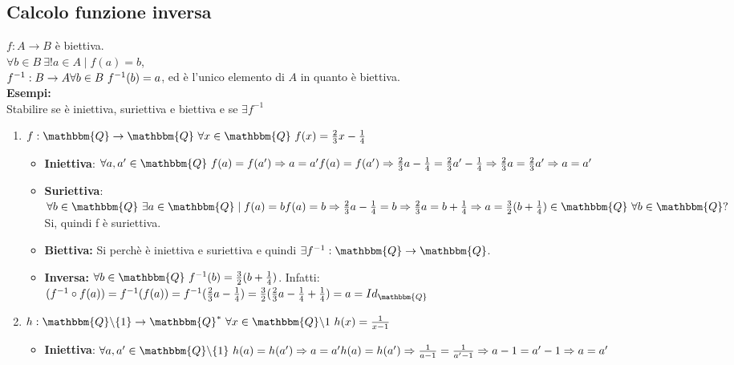 \documentclass[12pt, letterpaper]{report}
\begin{document}
		\subsection{Calcolo funzione inversa}
		$f: A \to B$ è biettiva.
		\\
		$\forall b \in B \ \exists! a \in A \mid f(a) = b$,
		\\
		$f^{-1}: B \to A \\ \forall b \in B \ f^{-1}(b) = a$, ed è l'unico elemento di $A$ in quanto è biettiva.
		\\
		\textbf{Esempi: }
		\\
		Stabilire se è iniettiva, suriettiva e biettiva e se $\exists f^{-1}$
		\begin{enumerate}
			\item $f: \mathbbm{Q} \to \mathbbm{Q} \ \forall x \in \mathbbm{Q} \ f(x) = \frac{2}{3}x - \frac{1}{4}$
			\begin{itemize}
				\item \textbf{Iniettiva}: $\forall a, a' \in \mathbbm{Q} \ f(a) = f(a') \Rightarrow a = a' \\ f(a) = f(a') \Rightarrow \frac{2}{3}a - \frac{1}{4} = \frac{2}{3}a' - \frac{1}{4} \Rightarrow \frac{2}{3}a = \frac{2}{3}a' \Rightarrow a = a'$
				\item \textbf{Suriettiva}: $\forall b \in \mathbbm{Q} \ \exists a \in \mathbbm{Q} \mid f(a) = b \\ f(a) = b \Rightarrow \frac{2}{3}a - \frac{1}{4} = b \Rightarrow \frac{2}{3}a = b + \frac{1}{4} \Rightarrow a = \frac{3}{2}(b + \frac{1}{4}) \in \mathbbm{Q} \ \forall b \in \mathbbm{Q} ?$ Si, quindi f è suriettiva.
				\item \textbf{Biettiva:} Si perchè è iniettiva e suriettiva e quindi $\exists f^{-1}: \mathbbm{Q} \to \mathbbm{Q}$.
				\item \textbf{Inversa:} $\forall b \in \mathbbm{Q} \ f^{-1}(b) = \frac{3}{2}(b + \frac{1}{4})$. Infatti: \\ $(f^{-1} \circ f(a)) = f^{-1}(f(a)) = f^{-1}(\frac{2}{3}a - \frac{1}{4}) = \frac{3}{2}(\frac{2}{3}a - \frac{1}{4} + \frac{1}{4}) = a = Id_{\mathbbm{Q}}$
			\end{itemize}
			\item $h: \mathbbm{Q} \backslash \{1\} \to \mathbbm{Q}^* \ \forall x \in \mathbbm{Q} \backslash {1} \ h(x) = \frac{1}{x - 1}$
			\begin{itemize}
				\item \textbf{Iniettiva}: $\forall a, a' \in \mathbbm{Q} \backslash \{1\} \ h(a) = h(a') \Rightarrow a = a' \\ h(a) = h(a') \Rightarrow \frac{1}{a - 1} = \frac{1}{a' - 1}\Rightarrow a - 1 = a' - 1 \Rightarrow a = a'$

\end{itemize}
\end{enumerate}
\end{document}
